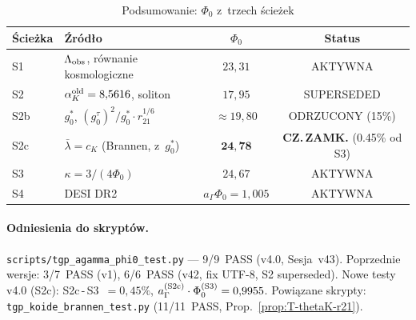 \begin{table}[h]
\centering
\caption{Podsumowanie: $\Phi_0$ z~trzech \'{s}cie\.zek}
\label{tab:W-summary}
\begin{tabular}{llcc}
\hline
\'{S}cie\.zka & \'{Z}r\'od\l{}o & $\Phi_0$ & Status \\
\hline
S1  & $\Lambda_{\rm obs}$, r\'ownanie kosmologiczne & $23{,}31$ & AKTYWNA \\
S2  & $\alpha_K^{\rm old}=8{,}5616$, soliton & $17{,}95$ & SUPERSEDED \\
S2b & $g_0^*$, $(g_0^\tau)^2/g_0^*\cdot r_{21}^{1/6}$ & $\approx 19{,}80$ & ODRZUCONY (15\%) \\
S2c & $\bar\lambda = c_K$ (Brannen, z~$g_0^*$) & $\mathbf{24{,}78}$ & \textbf{CZ.\,ZAMK.} (0.45\% od S3) \\
S3  & $\kappa = 3/(4\Phi_0)$ & $24{,}67$ & AKTYWNA \\
S4  & DESI DR2 & $a_\Gamma\Phi_0=1{,}005$ & AKTYWNA \\
\hline
\end{tabular}
\end{table}

\paragraph{Odniesienia do skrypt\'ow.}
\texttt{scripts/tgp\_agamma\_phi0\_test.py} — 9/9~PASS (v4.0, Sesja~v43).
Poprzednie wersje: 3/7~PASS (v1), 6/6~PASS (v42, fix UTF-8, S2 superseded).
Nowe testy v4.0 (S2c): S2c\,-\,S3~$=0{,}45\%$,
$a_\Gamma^{(\rm S2c)}\cdot\Phi_0^{(\rm S3)} = 0{,}9955$.
Powi\k{a}zane skrypty: \texttt{tgp\_koide\_brannen\_test.py}
(11/11~PASS, Prop.~\ref{prop:T-thetaK-r21}).

